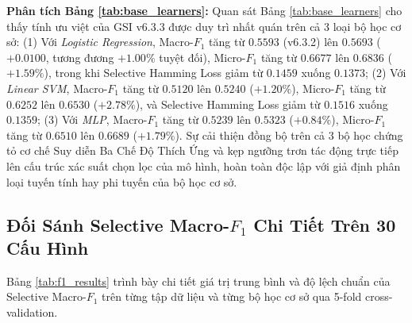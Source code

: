 \documentclass[10pt,a4paper,twoside]{article}
\begin{document}
\noindent\textbf{Phân tích Bảng \ref{tab:base_learners}:}
Quan sát Bảng \ref{tab:base_learners} cho thấy tính ưu việt của GSI v6.3.3 được duy trì nhất quán trên cả 3 loại bộ học cơ sở: (1) Với \textit{Logistic Regression}, Macro-$F_1$ tăng từ $0.5593$ (v6.3.2) lên $0.5693$ ($+0.0100$, tương đương $+1.00\%$ tuyệt đối), Micro-$F_1$ tăng từ $0.6677$ lên $0.6836$ ($+1.59\%$), trong khi Selective Hamming Loss giảm từ $0.1459$ xuống $0.1373$; (2) Với \textit{Linear SVM}, Macro-$F_1$ tăng từ $0.5120$ lên $0.5240$ ($+1.20\%$), Micro-$F_1$ tăng từ $0.6252$ lên $0.6530$ ($+2.78\%$), và Selective Hamming Loss giảm từ $0.1516$ xuống $0.1359$; (3) Với \textit{MLP}, Macro-$F_1$ tăng từ $0.5239$ lên $0.5323$ ($+0.84\%$), Micro-$F_1$ tăng từ $0.6510$ lên $0.6689$ ($+1.79\%$). Sự cải thiện đồng bộ trên cả 3 bộ học chứng tỏ cơ chế Suy diễn Ba Chế Độ Thích Ứng và kẹp ngưỡng trơn tác động trực tiếp lên cấu trúc xác suất chọn lọc của mô hình, hoàn toàn độc lập với giả định phân loại tuyến tính hay phi tuyến của bộ học cơ sở.

\subsection{Đối Sánh Selective Macro-\texorpdfstring{$F_1$}{F1} Chi Tiết Trên 30 Cấu Hình}
Bảng \ref{tab:f1_results} trình bày chi tiết giá trị trung bình và độ lệch chuẩn của Selective Macro-$F_1$ trên từng tập dữ liệu và từng bộ học cơ sở qua 5-fold cross-validation.
\end{document}
